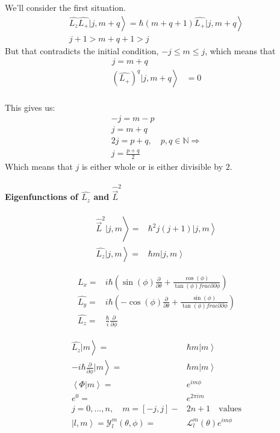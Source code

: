 			We'll consider the first situation.
			\begin{align}
				\left. \hat{L_z}\hat{L_+} | j,m+q \right\rangle	 = \left. \hbar(m+q+1) \hat{L_+}| j,m+q \right\rangle \\
				j + 1 > m+q+1 > j
			\end{align}
			But that contradicts the initial condition, $-j \leq m \leq j$, which means that
			\begin{align}
				j = m + q& \\ 
				\left. \left(\hat{L_+}\right)^q | j,m+q \right\rangle &= 0 \\
			\end{align}
			
		This gives us:
		\begin{align}
			-j = m - p \\
			j = m + q \\
			2j = p + q, \quad p,q \in \mathds{N} \Rightarrow \\
			j = \frac{p + q}{2}
		\end{align}
		Which means that $j$ is either whole or is either divisible by $2$.
		
		\paragraph{Eigenfunctions of $\hat{L_z}$ and $\hat{\vec{L}}^2$}
		
		\begin{align}
			\left. \hat{\vec{L}}^2|j,m\right\rangle =& \left. \hbar^2 j(j+1)|j,m\right\rangle\\
			\left. \hat{L_z}|j,m\right\rangle =& \left. \hbar m|j,m\right\rangle
		\end{align}
		
		\begin{align}
			\hat{L_x} =& i \hbar \left( \sin(\phi)\frac{\partial}{\partial \theta} + \frac{\cos(\phi)}{\tan(\phi)frac{\partial}{\partial \phi}} \right) \\
			\hat{L_y} =& i \hbar \left( - \cos(\phi)\frac{\partial}{\partial \theta} + \frac{\sin(\phi)}{\tan(\phi)frac{\partial}{\partial \phi}} \right)	\\
			\hat{L_z} =& \frac{\hbar}{i} \frac{\partial}{\partial \phi}
		\end{align}
		
		\begin{align}
			\left.\hat{L_z}| m \right\rangle =& \left. \hbar m | m \right\rangle \\
			\left.-i\hbar \frac{\partial}{\partial \phi}| m \right\rangle =& \left. \hbar m | m \right\rangle \\
			\left\langle \Phi | m \right\rangle =& e^{im\phi} \\
			e^{0} =& e^{2\pi i m} \\
			j = 0, ..., n, \quad m = \left[-j, j\right] -& 2n+1 \quad\text{values} \\
			\left. |l,m\right\rangle = \mathcal{Y}_l^m(\theta, \phi) =& \mathcal{L}_l^m(\theta)e^{im\phi}
		\end{align}
		

